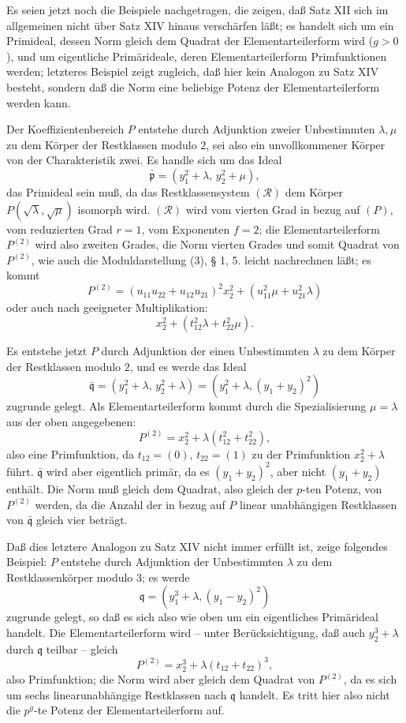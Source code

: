 \documentclass[11pt]{article}
\providecommand{\frakp}{\mathfrak p}
\providecommand{\frakq}{\mathfrak q}
\begin{document}
Es seien jetzt noch die Beispiele nachgetragen, die zeigen, daß Satz XII sich im allgemeinen nicht über Satz XIV hinaus verschärfen läßt; es handelt sich um ein Primideal, dessen Norm gleich dem Quadrat der Elementarteilerform wird ($g>0$), und um eigentliche Primärideale, deren Elementarteilerform Primfunktionen werden; letzteres Beispiel zeigt zugleich, daß hier kein Analogon zu Satz XIV besteht, sondern daß die Norm eine beliebige Potenz der Elementarteilerform werden kann.

Der Koeffizientenbereich $P$ entstehe durch Adjunktion zweier Unbestimmten $\lambda,\mu$ zu dem Körper der Restklassen modulo $2$, sei also ein unvollkommener Körper von der Charakteristik zwei. Es handle sich um das Ideal
\[
 \bar{\frakp}=(y_1^2+\lambda,\,y_2^2+\mu),
\]
das Primideal sein muß, da das Restklassensystem $(\mathcal R)$ dem Körper $P(\sqrt\lambda,\sqrt\mu)$ isomorph wird. $(\mathcal R)$ wird vom vierten Grad in bezug auf $(P)$, vom reduzierten Grad $r=1$, vom Exponenten $f=2$; die Elementarteilerform $P^{(2)}$ wird also zweiten Grades, die Norm vierten Grades und somit Quadrat von $P^{(2)}$, wie auch die Moduldarstellung (3), § 1, 5. leicht nachrechnen läßt; es kommt
\[
 P^{(2)}=(u_{11}u_{22}+u_{12}u_{21})^2x_2^2+(u_{11}^2\mu+u_{21}^2\lambda)
\]
oder auch nach geeigneter Multiplikation:
\[
 x_2^2+(t_{12}^2\lambda+t_{22}^2\mu).
\]

Es entstehe jetzt $P$ durch Adjunktion der einen Unbestimmten $\lambda$ zu dem Körper der Restklassen modulo $2$, und es werde das Ideal
\[
 \bar{\frakq}=(y_1^2+\lambda,\,y_2^2+\lambda)=(y_1^2+\lambda,(y_1+y_2)^2)
\]
zugrunde gelegt. Als Elementarteilerform kommt durch die Spezialisierung $\mu=\lambda$ aus der oben angegebenen:
\[
 P^{(2)}=x_2^2+\lambda(t_{12}^2+t_{22}^2),
\]
also eine Primfunktion, da $t_{12}=(0)$, $t_{22}=(1)$ zu der Primfunktion $x_2^2+\lambda$ führt. $\bar{\frakq}$ wird aber eigentlich primär, da es $(y_1+y_2)^2$, aber nicht $(y_1+y_2)$ enthält. Die Norm muß gleich dem Quadrat, also gleich der $p$-ten Potenz, von $P^{(2)}$ werden, da die Anzahl der in bezug auf $P$ linear unabhängigen Restklassen von $\bar{\frakq}$ gleich vier beträgt.

Daß dies letztere Analogon zu Satz XIV nicht immer erfüllt ist, zeige folgendes Beispiel: $P$ entstehe durch Adjunktion der Unbestimmten $\lambda$ zu dem Restklassenkörper modulo $3$; es werde
\[
 \frakq=(y_1^3+\lambda,(y_1-y_2)^2)
\]
zugrunde gelegt, so daß es sich also wie oben um ein eigentliches Primärideal handelt. Die Elementarteilerform wird -- unter Berücksichtigung, daß auch $y_2^3+\lambda$ durch $\frakq$ teilbar -- gleich
\[
 P^{(2)}=x_2^3+\lambda(t_{12}+t_{22})^3,
\]
also Primfunktion; die Norm wird aber gleich dem Quadrat von $P^{(2)}$, da es sich um sechs linearunabhängige Restklassen nach $\frakq$ handelt. Es tritt hier also nicht die $p^g$-te Potenz der Elementarteilerform auf.
\end{document}

